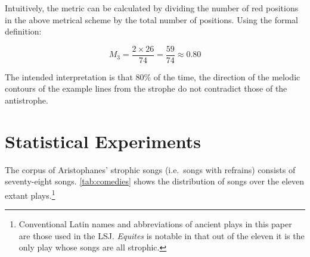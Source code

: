 \documentclass[twoside]{article}
\begin{document}
Intuitively, the metric can be calculated by dividing the number of red positions in the above metrical scheme by the total number of positions. Using the formal definition:

\[
M_3 = \frac{2 \times 26}{74} = \frac{59}{74} \approx 0.80
\]

The intended interpretation is that 80\% of the time, the direction of the melodic contours of the example lines from the strophe do not contradict those of the antistrophe. 


\section{Statistical Experiments}\label{sec:experiments}

The corpus of Aristophanes' strophic songs (i.e.\ songs with refrains) consists of seventy-eight songs. \autoref{tab:comedies} shows the distribution of songs over the eleven extant plays.\footnote{Conventional Latin names and abbreviations of ancient plays in this paper are those used in the LSJ. \textit{Equites} is notable in that out of the eleven it is the only play whose songs are all strophic.}
\end{document}

